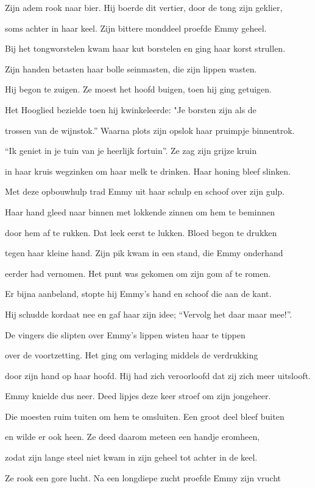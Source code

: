 Zijn adem rook naar bier.
Hij boerde dit vertier,
door de tong zijn geklier,

soms achter in haar keel.
Zijn bittere monddeel
proefde Emmy geheel.

Bij het tongworstelen
kwam haar kut borstelen
en ging haar korst strullen.

Zijn handen betasten
haar bolle seinmasten,
die zijn lippen wasten.

Hij begon te zuigen.
Ze moest het hoofd buigen,
toen hij ging getuigen.

Het Hooglied bezielde
toen hij kwinkeleerde:
"Je borsten zijn als de

trossen van de wijnstok.”
Waarna plots zijn opslok
haar pruimpje binnentrok.

“Ik geniet in je tuin
van je heerlijk fortuin”.
Ze zag zijn grijze kruin

in haar kruis wegzinken
om haar melk te drinken.
Haar honing bleef slinken.

Met deze opbouwhulp
trad Emmy uit haar schulp
en schoof over zijn gulp.

Haar hand gleed naar binnen
met lokkende zinnen
om hem te beminnen

door hem af te rukken.
Dat leek eerst te lukken.
Bloed begon te drukken

tegen haar kleine hand.
Zijn pik kwam in een stand,
die Emmy onderhand

eerder had vernomen.
Het punt was gekomen
om zijn gom af te romen.

Er bijna aanbeland,
stopte hij Emmy’s hand
en schoof die aan de kant.

Hij schudde kordaat nee
en gaf haar zijn idee;
“Vervolg het daar maar mee!”.

De vingers die slipten
over Emmy’s lippen
wisten haar te tippen

over de voortzetting.
Het ging om verlaging
middels de verdrukking

door zijn hand op haar hoofd.
Hij had zich veroorloofd
dat zij zich meer uitslooft.

Emmy knielde dus neer.
Deed lipjes deze keer
stroef om zijn jongeheer.

Die moesten ruim tuiten
om hem te omsluiten.
Een groot deel bleef buiten

en wilde er ook heen.
Ze deed daarom meteen
een handje eromheen,

zodat zijn lange steel
niet kwam in zijn geheel
tot achter in de keel.

Ze rook een gore lucht.
Na een longdiepe zucht
proefde Emmy zijn vrucht


